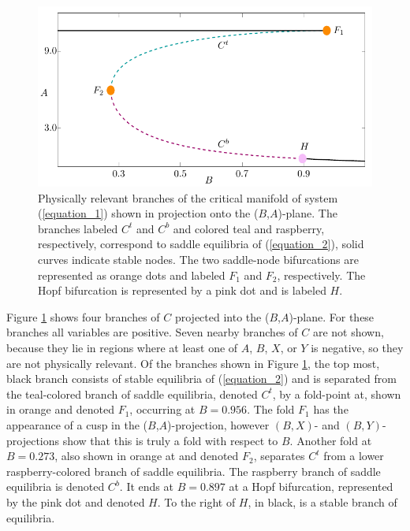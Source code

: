 \documentclass{ws-ijbc}
\begin{document}
\begin{figure}[!t]
\begin{center}
\includegraphics[page=1]{figures.pdf}
\end{center}
\caption{Physically relevant branches of the critical manifold of system (\ref{equation_1}) shown in projection onto the ($B$,$A$)-plane.  The branches labeled $C^t$ and $C^b$ and colored teal and raspberry, respectively, correspond to saddle equilibria of (\ref{equation_2}), solid curves indicate stable nodes.  The two saddle-node bifurcations are represented as orange dots and labeled $F_1$ and $F_2$, respectively.  The Hopf bifurcation is represented by a pink dot and is labeled $H$.}
\label{critical_figure}
\end{figure}

Figure \ref{critical_figure} shows four branches of $C$ projected into the ($B$,$A$)-plane.  For these branches all variables are positive.  Seven nearby branches of $C$ are not shown, because they lie in regions where at least one of $A$, $B$, $X$, or $Y$ is negative, so they are not physically relevant.  Of the branches shown in Figure \ref{critical_figure}, the top most, black branch consists of stable equilibria of (\ref{equation_2}) and is separated from the teal-colored branch of saddle equilibria, denoted $C^t$, by a fold-point at, shown in orange and denoted $F_1$, occurring at $B = 0.956$.  The fold $F_1$ has the appearance of a cusp in the ($B$,$A$)-projection, however $(B,X)$- and $(B,Y)$- projections show that this is truly a fold with respect to $B$.  Another fold at $B = 0.273$, also shown in orange at and denoted $F_2$, separates $C^t$ from a lower raspberry-colored branch of saddle equilibria.  The raspberry branch of saddle equilibria is denoted $C^b$.  It ends at $B = 0.897$ at a Hopf bifurcation, represented by the pink dot and denoted $H$.  To the right of $H$, in black, is a stable branch of equilibria.  
    
\end{document}
